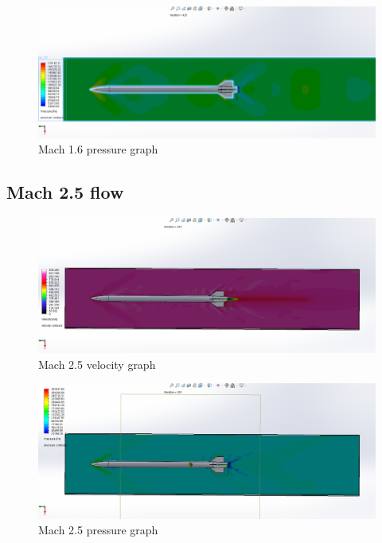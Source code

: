 \documentclass{article}
\begin{document}
\begin{figure}[H]
\centering
\includegraphics[width=\textwidth]{Final16Pressure}
\caption{Mach 1.6 pressure graph}
\label{fig:Final16Pressure}
\end{figure}

\subsection{Mach 2.5 flow}
\begin{figure}[H]
\centering
\includegraphics[width=\textwidth]{Final25Speed}
\caption{Mach 2.5 velocity graph}
\label{fig:Final25Speed}
\end{figure}

\begin{figure}[H]
\centering
\includegraphics[width=\textwidth]{Final25Pressure}
\caption{Mach 2.5 pressure graph}
\label{fig:Final25Pressure}
\end{figure}
\end{document}

